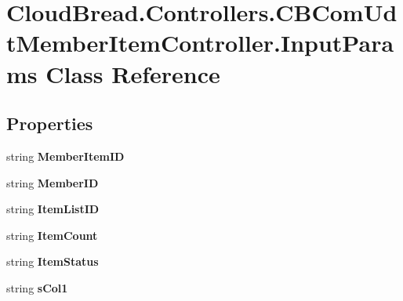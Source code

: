 \hypertarget{a00109}{}\section{Cloud\+Bread.\+Controllers.\+C\+B\+Com\+Udt\+Member\+Item\+Controller.\+Input\+Params Class Reference}
\label{a00109}
\subsection*{Properties}
\begin{DoxyCompactItemize}
\item 
string {\bfseries Member\+Item\+ID}\hypertarget{a00109_a7e4815cac41eecfec43c3fb83e876515}{}\label{a00109_a7e4815cac41eecfec43c3fb83e876515}

\item 
string {\bfseries Member\+ID}\hypertarget{a00109_ab00603cd2de374d9a148dff888187959}{}\label{a00109_ab00603cd2de374d9a148dff888187959}

\item 
string {\bfseries Item\+List\+ID}\hypertarget{a00109_a67777e9d016e83236467fc2914432d73}{}\label{a00109_a67777e9d016e83236467fc2914432d73}

\item 
string {\bfseries Item\+Count}\hypertarget{a00109_a9d7d24000fe4d6964183e9f993f10711}{}\label{a00109_a9d7d24000fe4d6964183e9f993f10711}

\item 
string {\bfseries Item\+Status}\hypertarget{a00109_afbb4e8703342559320fa5d544d3fb6c1}{}\label{a00109_afbb4e8703342559320fa5d544d3fb6c1}

\item 
string {\bfseries s\+Col1}\hypertarget{a00109_ade29aabf95f80dbdb322139ae32224a3}{}\label{a00109_ade29aabf95f80dbdb322139ae32224a3}


\end{DoxyCompactItemize}
